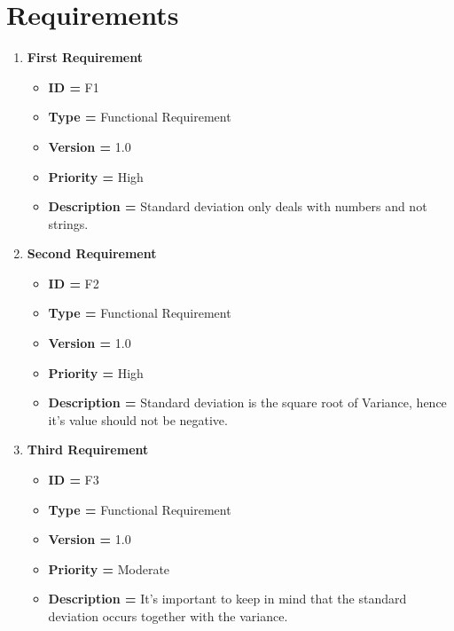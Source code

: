 \documentclass[a4paper, 12pt]{article}
\begin{document}
\section*{Requirements}
\begin{enumerate}[noitemsep]
        \item \textbf{First Requirement}
        \begin{itemize}[noitemsep]
            \item \textbf{ID = } F1
            \item\textbf{Type = } Functional Requirement
            \item\textbf{Version = } 1.0
            \item\textbf{Priority = } High
            \item\textbf{Description = } Standard deviation only deals with numbers and not strings.
        \end{itemize}
        \item \textbf{Second Requirement}
        \begin{itemize}[noitemsep]
            \item \textbf{ID = } F2
            \item\textbf{Type = } Functional Requirement
            \item\textbf{Version = } 1.0
            \item\textbf{Priority = } High
            \item\textbf{Description = } Standard deviation is the square root of Variance, hence it's value should not be negative.
        \end{itemize}
        \item \textbf{Third Requirement}
        \begin{itemize}[noitemsep]
            \item \textbf{ID = } F3
            \item\textbf{Type = } Functional Requirement
            \item\textbf{Version = } 1.0
            \item\textbf{Priority = } Moderate
            \item\textbf{Description = }  It's important to keep in mind that the standard deviation occurs together with the variance.
        \end{itemize}
        

\end{enumerate}
\end{document}
